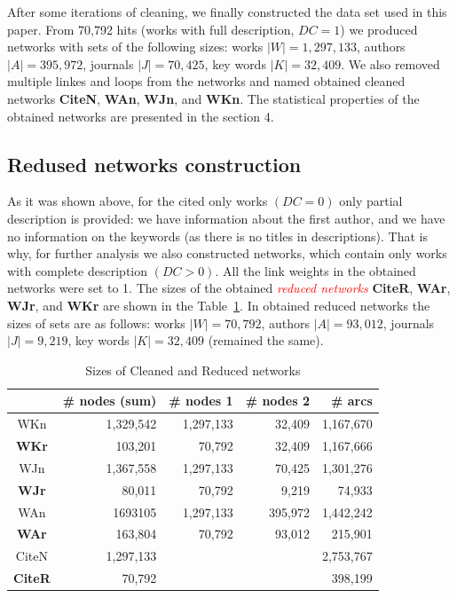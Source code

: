 \documentclass[11pt]{article} %
\newcommand{\keyw}[1]{\textcolor{red}{\emph{#1}}}
\begin{document}
After some iterations of cleaning, we finally constructed the data set used in this paper. From 70,792 hits (works with full description, $DC=1$) we produced networks with sets of the following sizes: works $|W| = 1,297,133$, authors $|A| = 395,972$, journals $|J| = 70,425$, key words $|K| = 32,409$. We also removed multiple linkes and loops from the networks and named obtained cleaned networks \textbf{CiteN}, \textbf{WAn}, \textbf{WJn}, and \textbf{WKn}. The statistical properties of the obtained networks are presented in the section 4. \medskip  

\subsection{Redused networks construction}

As it was shown above, for the cited only  works  $(DC=0)$ only partial description is provided: we have information about the first author, and we have no information on the keywords (as there is no titles in descriptions). That is why, for further analysis we also constructed networks, which contain only works with complete description $(DC>0)$. All the link weights in the obtained networks were set to 1. The sizes of the obtained \keyw{reduced networks} \textbf{CiteR}, \textbf{WAr}, \textbf{WJr}, and \textbf{WKr} are shown in the Table~\ref{rednet}. In obtained reduced networks  the sizes of sets are as follows: works $|W| = 70,792$, authors $|A| = 93,012$, journals $|J| = 9,219$, key words $|K| = 32,409$ (remained the same).\medskip 

\begin{table}
\caption{Sizes of Cleaned and Reduced networks}\label{rednet}\medskip
\begin{center}
\begin{tabular}{c|r|r|r|r}
	&\# nodes (sum)	& \# nodes 1	&\# nodes 2	& \# arcs \\ \hline		 
WKn &  	1,329,542	& 1,297,133	& 32,409	& 1,167,670 \\
\textbf{WKr}	& 103,201	& 70,792	& 32,409	& 1,167,666 \\ \hline	
WJn & 	1,367,558	& 1,297,133	& 70,425	& 1,301,276 \\ 
\textbf{WJr} 	& 80,011	& 70,792	& 9,219	& 74,933 \\ \hline	
WAn	& 1693105	& 1,297,133	& 395,972	& 1,442,242 \\ 
\textbf{WAr}	& 163,804	& 70,792	& 93,012	& 215,901 \\ \hline	
CiteN & 1,297,133 & & & 2,753,767\\ 
\textbf{CiteR} & 70,792 & & & 398,199 \\ \hline
\end{tabular}				
\end{center}
\end{table}
\end{document}

